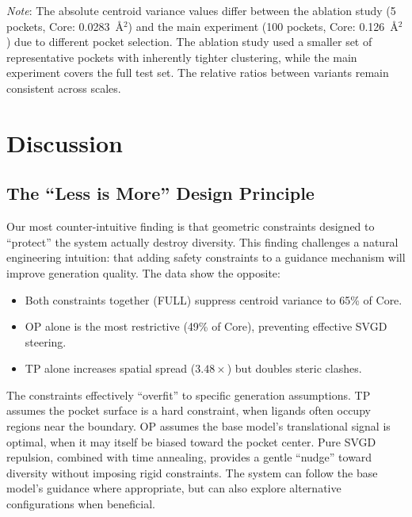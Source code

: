 \documentclass[a4paper,11pt]{article}
\begin{document}
\noindent\textit{Note}: The absolute centroid variance values differ between the
ablation study (5 pockets, Core: 0.0283~\AA$^2$) and the main experiment (100
pockets, Core: 0.126~\AA$^2$) due to different pocket selection.  The ablation
study used a smaller set of representative pockets with inherently tighter
clustering, while the main experiment covers the full test set.  The relative
ratios between variants remain consistent across scales.

\section{Discussion}

\subsection{The ``Less is More'' Design Principle}

Our most counter-intuitive finding is that geometric constraints designed to
``protect'' the system actually destroy diversity.  This finding challenges a
natural engineering intuition: that adding safety constraints to a guidance
mechanism will improve generation quality.  The data show the opposite:

\begin{itemize}
  \item Both constraints together (FULL) suppress centroid variance to 65\% of
    Core.
  \item OP alone is the most restrictive (49\% of Core), preventing effective
    SVGD steering.
  \item TP alone increases spatial spread ($3.48\times$) but doubles steric
    clashes.
\end{itemize}

The constraints effectively ``overfit'' to specific generation assumptions.  TP
assumes the pocket surface is a hard constraint, when ligands often occupy
regions near the boundary.  OP assumes the base model's translational signal is
optimal, when it may itself be biased toward the pocket center.  Pure SVGD
repulsion, combined with time annealing, provides a gentle ``nudge'' toward
diversity without imposing rigid constraints.  The system can follow the base
model's guidance where appropriate, but can also explore alternative
configurations when beneficial.
\end{document}
